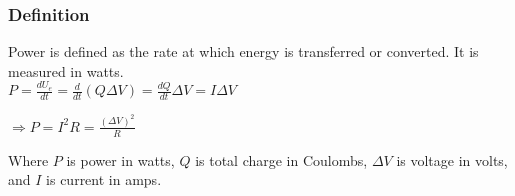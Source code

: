 \subsubsection*{Definition}
\hspace{.5cm} Power is defined as the rate at which energy is transferred or converted. It is measured in watts.\\
\vbox{
    \center
    $P = \frac{dU_e}{dt} = \frac{d}{dt} (Q\Delta V) = \frac{dQ}{dt}\Delta V = I\Delta V$
}

\vbox{
    \center
    $\Longrightarrow P = I^2R = \frac{(\Delta V)^2}{R}$
}
\vspace{12pt}

Where $P$ is power in watts, $Q$ is total charge in Coulombs, $\Delta V$ is voltage in volts, and $I$ is current in amps.
